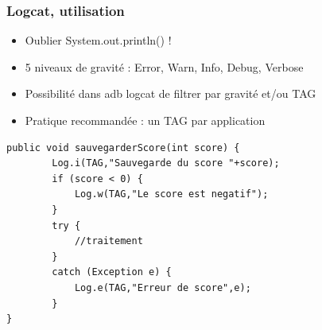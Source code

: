 \documentclass{beamer}
\begin{document}
\begin{frame}[fragile]
\frametitle{Logcat, utilisation}
\begin{itemize}
  \item Oublier System.out.println() !
  \item 5 niveaux de gravité : Error, Warn, Info, Debug, Verbose
  \item Possibilité dans adb logcat de filtrer par gravité et/ou TAG
  \item Pratique recommandée : un TAG par application
 \end{itemize}
 \begin{lstlisting}
public void sauvegarderScore(int score) {
        Log.i(TAG,"Sauvegarde du score "+score);
        if (score < 0) {
            Log.w(TAG,"Le score est negatif");
        }
        try {
            //traitement
        }
        catch (Exception e) {
        	Log.e(TAG,"Erreur de score",e);
        }
}
\end{lstlisting}
\end{frame}
\end{document}
